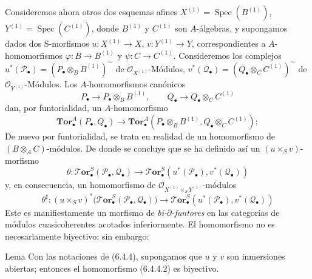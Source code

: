 \begin{env}[6.4.4]
Consideremos ahora otros dos esquemas afines
$X^{(1)}=\operatorname{Spec}(B^{(1)})$,
$Y^{(1)}=\operatorname{Spec}(C^{(1)})$, donde $B^{(1)}$ y $C^{(1)}$ son
$A$-álgebras, y supongamos dados dos
S-morfismos $u:X^{(1)}\to X$, $v:Y^{(1)}\to Y$, correspondientes a
$A$-homomorfismos
$\varphi:B\to B^{(1)}$ y
$\psi:C\to C^{(1)}$.
Consideremos los complejos
$u^*(\mathscr P_\bullet)=(P_\bullet\otimes_B B^{(1)})^{\sim}$ de
$\mathscr O_{X^{(1)}}$-Módulos,
$v^*(\mathscr Q_\bullet)=(Q_\bullet\otimes_C C^{(1)})^{\sim}$ de
$\mathscr O_{Y^{(1)}}$-Módulos. Los $A$-homomorfismos canónicos
\[
  P_\bullet\longrightarrow P_\bullet\otimes_B B^{(1)},
  \qquad
  Q_\bullet\longrightarrow Q_\bullet\otimes_C C^{(1)}
\]
dan, por funtorialidad, un $A$-homomorfismo
\[
  \mathbf{Tor}_\bullet^A(P_\bullet,Q_\bullet)
  \longrightarrow
  \mathbf{Tor}_\bullet^A
  (P_\bullet\otimes_B B^{(1)},Q_\bullet\otimes_C C^{(1)});
\]
De nuevo por funtorialidad, se trata en realidad de un homomorfismo
de $(B\otimes_A C)$-módulos. De donde se concluye que se ha definido así un $(u\times_S v)$-morfismo
\[
  \theta:\boldsymbol{\mathscr{T}\!or}_\bullet^S(\mathscr P_\bullet,\mathscr Q_\bullet)
  \longrightarrow
  \boldsymbol{\mathscr{T}\!or}_\bullet^S
  (u^*(\mathscr P_\bullet),v^*(\mathscr Q_\bullet))
  \tag{6.4.4.1}\label{III.6.4.4.1.fr}
\]
y, en consecuencia, un homomorfismo de
$\mathscr O_{X^{(1)}\times_S Y^{(1)}}$-módulos
\[
  \theta^\sharp:(u\times_S v)^*
  \bigl(\boldsymbol{\mathscr{T}\!or}_\bullet^S(\mathscr P_\bullet,\mathscr Q_\bullet)\bigr)
  \longrightarrow
  \boldsymbol{\mathscr{T}\!or}_\bullet^S
  (u^*(\mathscr P_\bullet),v^*(\mathscr Q_\bullet))
  \tag{6.4.4.2}\label{III.6.4.4.2.fr}
\]
Este es manifiestamente un morfismo de \emph{bi-$\partial$-funtores} en
las categorías de módulos cuasicoherentes acotados inferiormente.
El homomorfismo  no es necesariamente biyectivo;
sin embargo:
\end{env}

\begin{namedtheorem}[6.4.5]{Lema}
Con las notaciones de \textup{(6.4.4)}, supongamos que $u$ y $v$ son inmersiones
abiertas; entonces el homomorfismo \textup{(6.4.4.2)} es biyectivo.
\end{namedtheorem}

